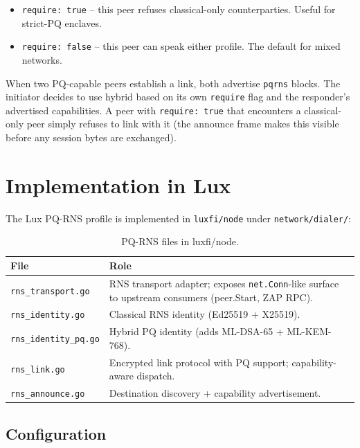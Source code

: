 \documentclass[11pt,a4paper]{article}
\begin{document}
\begin{itemize}[leftmargin=*,itemsep=0pt]
\item \texttt{require: true} -- this peer refuses classical-only
  counterparties. Useful for strict-PQ enclaves.
\item \texttt{require: false} -- this peer can speak either profile.
  The default for mixed networks.
\end{itemize}

When two PQ-capable peers establish a link, both advertise
\texttt{pqrns} blocks. The initiator decides to use hybrid based on
its own \texttt{require} flag and the responder's advertised
capabilities. A peer with \texttt{require: true} that encounters a
classical-only peer simply refuses to link with it (the announce frame
makes this visible before any session bytes are exchanged).

\section{Implementation in Lux}
\label{sec:lux-impl}

The Lux PQ-RNS profile is implemented in \texttt{luxfi/node} under
\texttt{network/dialer/}:

\begin{table}[H]
\centering
\small
\begin{tabularx}{\linewidth}{l X}
\toprule
\textbf{File} & \textbf{Role} \\
\midrule
\texttt{rns\_transport.go} & RNS transport adapter; exposes \texttt{net.Conn}-like surface to upstream consumers (peer.Start, ZAP RPC). \\
\texttt{rns\_identity.go} & Classical RNS identity (Ed25519 + X25519). \\
\texttt{rns\_identity\_pq.go} & Hybrid PQ identity (adds ML-DSA-65 + ML-KEM-768). \\
\texttt{rns\_link.go} & Encrypted link protocol with PQ support; capability-aware dispatch. \\
\texttt{rns\_announce.go} & Destination discovery + capability advertisement. \\
\bottomrule
\end{tabularx}
\caption{PQ-RNS files in luxfi/node.}
\end{table}

\subsection{Configuration}
\end{document}
